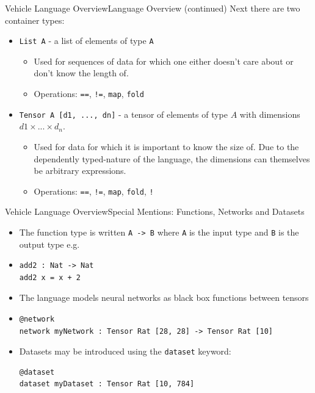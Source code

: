\documentclass[t,compress,aspectratio=169]{beamer}
\newcommand{\vehicle}[1]{{\texttt{#1}}}
\begin{document}
\begin{frame}{Vehicle Language Overview}{Language Overview (continued)}
Next there are two container types:
\begin{itemize}
\item \vehicle{List A} - a list of elements of type \vehicle{A} 
\begin{itemize}
\item Used for sequences of data for which one either doesn't care about or don't know the length of.
\item Operations: \vehicle{==}, \vehicle{!=}, \vehicle{map}, \vehicle{fold}
\end{itemize}
\item \vehicle{Tensor A [d1, ..., dn]} - a tensor of elements of type $A$ with dimensions $d1 \times ... \times d_n$.
\begin{itemize}
\item Used for data for which it is important to know the size of. Due to the dependently typed-nature of the language, the dimensions can themselves be arbitrary expressions.
\item Operations: \vehicle{==}, \vehicle{!=}, \vehicle{map}, \vehicle{fold}, \vehicle{!}
\end{itemize}
\end{itemize}
\end{frame}

\begin{frame}[containsverbatim]{Vehicle Language Overview}{Special Mentions: Functions, Networks and Datasets}

\begin{itemize}
    \item The function type is written  \vehicle{A -> B} where \vehicle{A} is the input type and \vehicle{B} is the output type e.g.
    \item[]\begin{verbatim}
add2 : Nat -> Nat
add2 x = x + 2
\end{verbatim}
\end{itemize}

\begin{itemize}
    \item The language models neural networks as black box functions between tensors
    \item[]\begin{verbatim}
@network
network myNetwork : Tensor Rat [28, 28] -> Tensor Rat [10]
\end{verbatim}
\end{itemize}

\begin{itemize}
    \item Datasets may be introduced using the \vehicle{dataset} keyword:
\begin{verbatim}
@dataset
dataset myDataset : Tensor Rat [10, 784]
\end{verbatim}
\end{itemize}



\end{frame}
\end{document}
